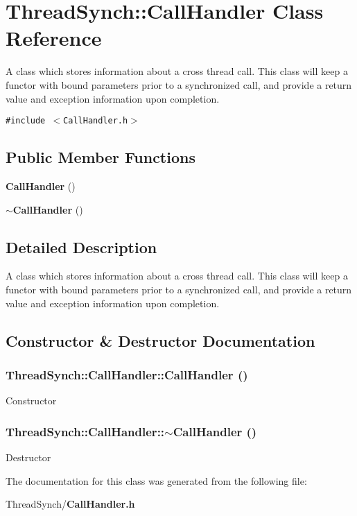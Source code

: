 \section{Thread\-Synch::Call\-Handler Class Reference}
\label{class_thread_synch_1_1_call_handler}
A class which stores information about a cross thread call. This class will keep a functor with bound parameters prior to a synchronized call, and provide a return value and exception information upon completion.  


{\tt \#include $<$Call\-Handler.h$>$}

\subsection*{Public Member Functions}
\begin{CompactItemize}
\item 
{\bf Call\-Handler} ()
\item 
{\bf $\sim$Call\-Handler} ()
\end{CompactItemize}


\subsection{Detailed Description}
A class which stores information about a cross thread call. This class will keep a functor with bound parameters prior to a synchronized call, and provide a return value and exception information upon completion. 



\subsection{Constructor \& Destructor Documentation}
\subsubsection{\setlength{\rightskip}{0pt plus 5cm}Thread\-Synch::Call\-Handler::Call\-Handler ()}\label{class_thread_synch_1_1_call_handler_00596b487225875df620860225cbdaff}


Constructor 
\subsubsection{\setlength{\rightskip}{0pt plus 5cm}Thread\-Synch::Call\-Handler::$\sim$Call\-Handler ()}\label{class_thread_synch_1_1_call_handler_babec161e856179c27dd9f4876ba64d2}


Destructor 

The documentation for this class was generated from the following file:\begin{CompactItemize}
\item 
Thread\-Synch/{\bf Call\-Handler.h}\end{CompactItemize}
